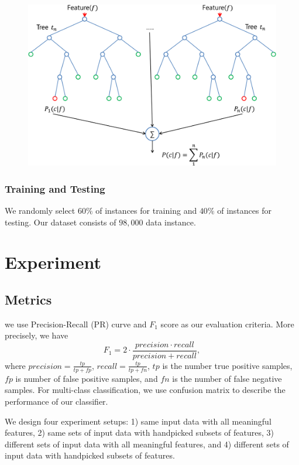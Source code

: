 \documentclass{sig-alternate}
\begin{document}
\begin{figure}[t]
\begin{center}
   \includegraphics[width=0.95\linewidth]{./figures/rf.png}
\end{center}
   \caption{}
\label{fig:rf}
\end{figure}

\subsubsection{Training and Testing}
We randomly select $60\%$ of instances for training and $40\%$ of instances for testing. Our dataset consists of $98,000$ data instance.

\section{Experiment}

\subsection{Metrics}
we use Precision-Recall (PR) curve and $F_1$ score as our evaluation criteria. More precisely, we have
\begin{equation}
F_{1} = 2\cdot\frac{precision \cdot recall}{precision + recall},
\end{equation}
where $precision = \frac{tp}{tp+fp}$, $recall = \frac{tp}{tp+fn}$, $tp$ is the number true positive samples, $fp$ is number of false positive samples, and $fn$ is the number of false negative samples. For multi-class classification, we use confusion matrix to describe the performance of our classifier.

We design four experiment setups: 1) same input data with all meaningful features, 2) same sets of input data with handpicked subsets of features, 3) different sets of input data with all meaningful features, and 4) different sets of input data with handpicked subsets of features.
\end{document}
